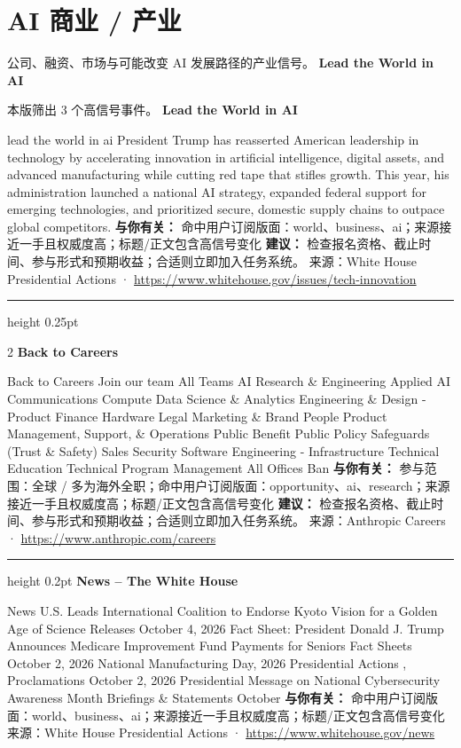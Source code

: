 \documentclass[10.5pt]{ctexart}
\begin{document}
\section*{AI 商业 / 产业}
{\color{ormuted} 公司、融资、市场与可能改变 AI 发展路径的产业信号。}
\vspace{2mm}
{\LARGE\bfseries Lead the World in AI}\par
\vspace{1mm}
{\color{ormuted} 本版筛出 3 个高信号事件。}
\vspace{3mm}
{\Large\bfseries Lead the World in AI}\par
lead the world in ai President Trump has reasserted American leadership in technology by accelerating innovation in artificial intelligence, digital assets, and advanced manufacturing while cutting red tape that stifles growth. This year, his administration launched a national AI strategy, expanded federal support for emerging technologies, and prioritized secure, domestic supply chains to outpace global competitors.
\textbf{与你有关：} 命中用户订阅版面：world、business、ai；来源接近一手且权威度高；标题/正文包含高信号变化
\textbf{建议：} 检查报名资格、截止时间、参与形式和预期收益；合适则立即加入任务系统。
{\footnotesize\color{ormuted} 来源：White House Presidential Actions · \url{https://www.whitehouse.gov/issues/tech-innovation}}
\vspace{4mm}
\hrule height 0.25pt
\vspace{3mm}
\begin{multicols}{2}
{\large\bfseries Back to Careers}\par
Back to Careers Join our team All Teams AI Research \& Engineering Applied AI Communications Compute Data Science \& Analytics Engineering \& Design - Product Finance Hardware Legal Marketing \& Brand People Product Management, Support, \& Operations Public Benefit Public Policy Safeguards (Trust \& Safety) Sales Security Software Engineering - Infrastructure Technical Education Technical Program Management All Offices Ban
\textbf{与你有关：} 参与范围：全球 / 多为海外全职；命中用户订阅版面：opportunity、ai、research；来源接近一手且权威度高；标题/正文包含高信号变化
\textbf{建议：} 检查报名资格、截止时间、参与形式和预期收益；合适则立即加入任务系统。
{\footnotesize\color{ormuted} 来源：Anthropic Careers · \url{https://www.anthropic.com/careers}}
\vspace{2mm}
\hrule height 0.2pt
\vspace{2mm}
{\large\bfseries News – The White House}\par
News U.S. Leads International Coalition to Endorse Kyoto Vision for a Golden Age of Science Releases October 4, 2026 Fact Sheet: President Donald J. Trump Announces Medicare Improvement Fund Payments for Seniors Fact Sheets October 2, 2026 National Manufacturing Day, 2026 Presidential Actions , Proclamations October 2, 2026 Presidential Message on National Cybersecurity Awareness Month Briefings \& Statements October 
\textbf{与你有关：} 命中用户订阅版面：world、business、ai；来源接近一手且权威度高；标题/正文包含高信号变化
{\footnotesize\color{ormuted} 来源：White House Presidential Actions · \url{https://www.whitehouse.gov/news}}
\end{multicols}
\end{document}
